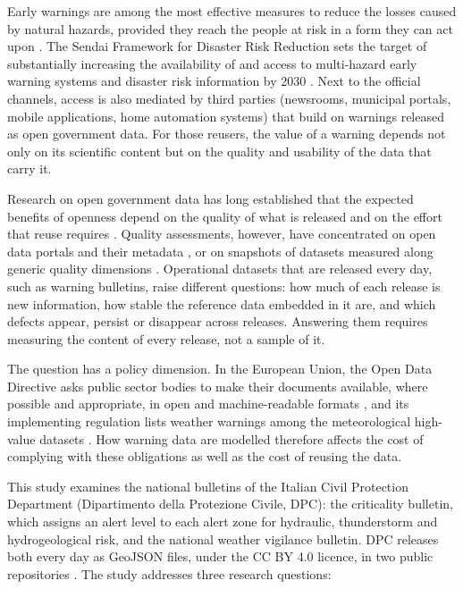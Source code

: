 \documentclass[review,authoryear,12pt]{elsarticle}
\begin{document}
Early warnings are among the most effective measures to reduce the losses
caused by natural hazards, provided they reach the people at risk in a form
they can act upon \citep{basher2006}. The Sendai Framework for Disaster Risk
Reduction sets the target of substantially increasing the availability of and
access to multi-hazard early warning systems and disaster risk information by
2030 \citep{unisdr2015}. Next to the official channels, access is also
mediated by third parties (newsrooms, municipal portals, mobile applications,
home automation systems) that build on warnings released as open government
data. For those reusers, the value of a warning depends not only on
its scientific content but on the quality and usability of the data that carry
it.

Research on open government data has long established that the expected
benefits of openness depend on the quality of what is released and on the
effort that reuse requires \citep{janssen2012,zuiderwijk2014,safarov2017}.
Quality assessments, however, have concentrated on open data portals and their
metadata \citep{umbrich2015,neumaier2016,kubler2018,machova2017}, or on
snapshots of datasets measured along generic quality dimensions
\citep{vetro2016}. Operational datasets that are released every day, such as
warning bulletins, raise different questions: how much of each release is new
information, how stable the reference data embedded in it are, and which
defects appear, persist or disappear across releases. Answering them requires
measuring the content of every release, not a sample of it.

The question has a policy dimension. In the European Union, the Open Data
Directive asks public sector bodies to make their documents available, where
possible and appropriate, in open and machine-readable formats
\citep{eu2019opendata}, and its implementing regulation lists weather warnings
among the meteorological high-value datasets \citep{eu2023hvd}. How warning data are modelled therefore
affects the cost of complying with these obligations as well as the cost of
reusing the data.

This study examines the national bulletins of the Italian Civil Protection
Department (Dipartimento della Protezione Civile, DPC): the criticality
bulletin, which assigns an alert level to each alert zone for hydraulic,
thunderstorm and hydrogeological risk, and the national weather vigilance
bulletin. DPC releases both every day as GeoJSON files, under the CC BY 4.0
licence, in two public repositories
\citep{dpc2026criticality,dpc2026vigilance}. The study addresses three
research questions:
\end{document}
